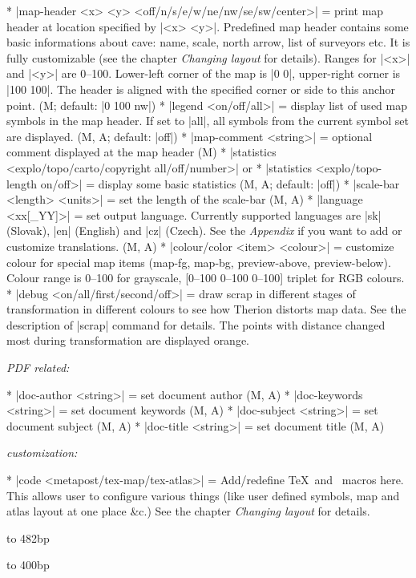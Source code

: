   * |map-header <x> <y> <off/n/s/e/w/ne/nw/se/sw/center>| = 
    print map header at location specified by |<x> <y>|. 
    Predefined map header contains some basic informations about
    cave: name, scale, north arrow, list of surveyors etc. It is fully 
    customizable (see the chapter {\it Changing layout} for details).
    Ranges for |<x>| and |<y>| are 0--100. Lower-left corner of the map 
    is |0 0|, 
    upper-right corner is |100 100|. The header is aligned with the specified 
    corner or side to this anchor point.
    (M; default: |0 100 nw|)
  * |legend <on/off/all>| = display list of used map symbols in the map header. 
    If set to |all|, all symbols from the current symbol set are displayed. 
    (M, A; default: |off|)
  * |map-comment <string>| = optional comment displayed at the map header (M)
  * |statistics <explo/topo/carto/copyright all/off/number>| or 
  * |statistics <explo/topo-length on/off>| = display some basic 
    statistics (M, A; default: |off|)
  * |scale-bar <length> <units>| = set the length of the scale-bar (M, A)
  * |language <xx[_YY]>| = set output language. Currently supported languages are
    |sk| (Slovak), |en| (English) and |cz| (Czech). See the {\it Appendix} if 
    you want to  add or customize translations. (M, A)
  * |colour/color <item> <colour>| = customize colour for special map
    items (map-fg, map-bg, preview-above, preview-below). 
    Colour range is 0--100 for grayscale, [0--100 0--100 0--100] triplet
    for RGB colours.
  * |debug <on/all/first/second/off>| = draw scrap in different stages
    of transformation in different colours to see how Therion distorts
    map data. See the description of |scrap| command for details.
    The points with distance changed most during transformation are displayed
    orange.

  {\it PDF related:}

  * |doc-author <string>| = set document author (M, A)
  * |doc-keywords <string>| = set document keywords (M, A)
  * |doc-subject <string>| = set document subject (M, A)
  * |doc-title <string>| = set document title (M, A)

  {\it customization:}

  * |code <metapost/tex-map/tex-atlas>| = Add/redefine \TeX\ and \MP\
    macros here. This allows user to configure various things 
    (like user defined symbols, map and atlas layout at one place \&c.)
    See the chapter {\it Changing layout} for details.
\endcomopt

\midinsert
  \ifx\pdfoutput\undefined\else
  \fi
  \vbox to 482bp{\centerline{\hbox to 400bp{%
    \ifx\pdfoutput\undefined
    \else
      \rlap{\pdfrefximage\pdflastximage}%
    \fi
    \hss}}\vss
  }
\endinsert


